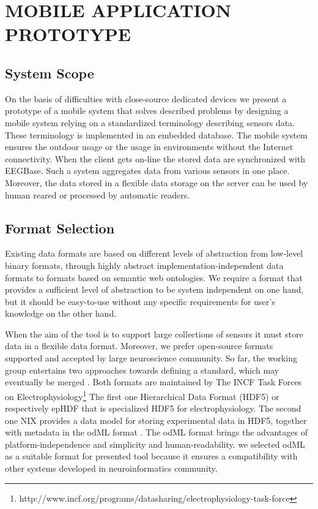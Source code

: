 \documentclass[a4paper,twoside]{article}
\begin{document}
\section{\uppercase{Mobile application prototype}}
\label{mobile_app_prototype}


\subsection{System Scope}

On the basis of difficulties with close-source dedicated devices we present a prototype of a mobile system that solves described problems by designing a mobile system relying on a standardized terminology describing sensors data. These terminology is implemented in an embedded database. The mobile system ensures the outdoor usage or the usage in environments without the Internet connectivity. When the client gets on-line the stored data are synchronized with EEGBase. Such a system aggregates data from various sensors in one place. Moreover, the data stored in a flexible data storage on the server can be used by human reared or processed by automatic readers.

\subsection{Format Selection}

Existing data formats are based on different levels of abstraction from low-level binary formats, through highly abstract implementation-independent data formats to formats based on semantic web ontologies. We require a format that provides a sufficient level of abstraction to be system independent on one hand, but it should be easy-to-use without any specific requirements for user's knowledge on the other hand.

When the aim of the tool is to support large collections of sensors it must store data in a flexible data format. Moreover, we prefer open-source formats supported and accepted by large neuroscience community. So far, the working group entertains two approaches towards defining a standard, which may eventually be merged \cite{10.3389/conf.fninf.2013.09.00069}. Both formats are maintained by The INCF Task Forces on Electrophysiology\footnote{http://www.incf.org/programs/datasharing/electrophysiology-task-force} The first one Hierarchical Data Format (HDF5) \cite{hdf5} or respectively epHDF that is specialized HDF5 for electrophysiology. The second one NIX \cite{Stoewer:2014}  provides a data model for storing experimental data in HDF5, together with metadata in the odML format \cite{10.3389/fninf.2011.00016}. The odML format brings the advantages of platform-independence and simplicity and human-readability.  we selected odML as a suitable format for presented tool because it ensures a compatibility with other systems developed in neuroinformatics community.
\end{document}

